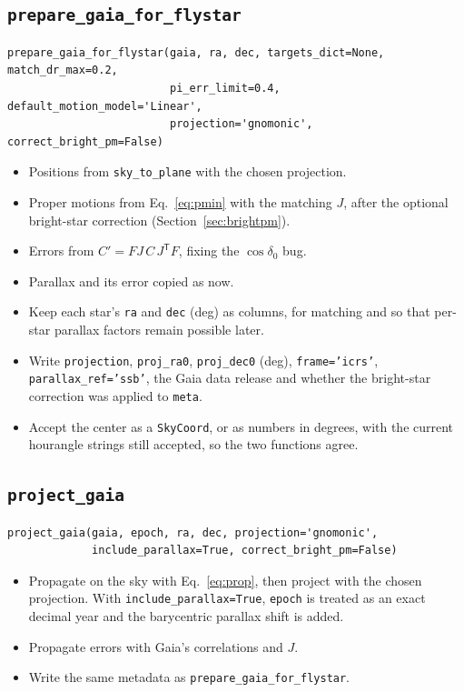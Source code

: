 \documentclass[11pt]{article}
\newcommand{\code}[1]{\texttt{#1}}
\begin{document}
\subsection{\code{prepare\_gaia\_for\_flystar}}

\begin{verbatim}
prepare_gaia_for_flystar(gaia, ra, dec, targets_dict=None, match_dr_max=0.2,
                         pi_err_limit=0.4, default_motion_model='Linear',
                         projection='gnomonic', correct_bright_pm=False)
\end{verbatim}
\begin{itemize}
  \item Positions from \code{sky\_to\_plane} with the chosen projection.
  \item Proper motions from Eq.~\eqref{eq:pmin} with the matching $J$, after
    the optional bright-star correction (Section~\ref{sec:brightpm}).
  \item Errors from $C' = FJ\,C\,J^{\mathsf T}F$, fixing the $\cos\delta_0$ bug.
  \item Parallax and its error copied as now.
  \item Keep each star's \code{ra} and \code{dec} (deg) as columns, for
    matching and so that per-star parallax factors remain possible later.
  \item Write \code{projection}, \code{proj\_ra0}, \code{proj\_dec0} (deg),
    \code{frame='icrs'}, \code{parallax\_ref='ssb'}, the Gaia data release and
    whether the bright-star correction was applied to \code{meta}.
  \item Accept the center as a \code{SkyCoord}, or as numbers in degrees, with
    the current hourangle strings still accepted, so the two functions agree.
\end{itemize}

\subsection{\code{project\_gaia}}

\begin{verbatim}
project_gaia(gaia, epoch, ra, dec, projection='gnomonic',
             include_parallax=True, correct_bright_pm=False)
\end{verbatim}
\begin{itemize}
  \item Propagate on the sky with Eq.~\eqref{eq:prop}, then project with the
    chosen projection. With \code{include\_parallax=True}, \code{epoch} is
    treated as an exact decimal year and the barycentric parallax shift is
    added.
  \item Propagate errors with Gaia's correlations and $J$.
  \item Write the same metadata as \code{prepare\_gaia\_for\_flystar}.
\end{itemize}
\end{document}

